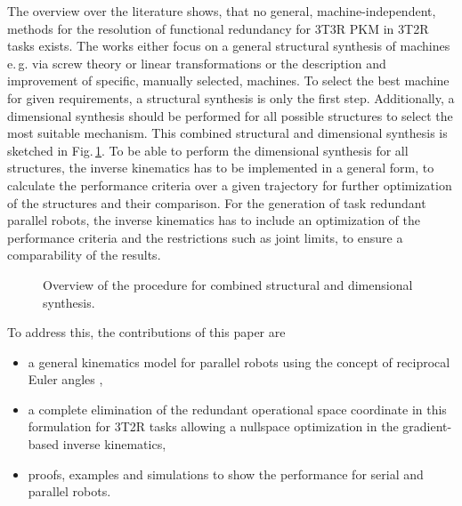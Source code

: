 \documentclass[robotics,article,submit,moreauthors,pdftex]{Definitions/mdpi}
\begin{document}
The overview over the literature shows, that no general, machine-independent, methods for the resolution of functional redundancy for 3T3R PKM in 3T2R tasks exists.
The works either focus on a general structural synthesis of machines e.\,g. via screw theory \cite{KongGos2005} or linear transformations \cite{Gogu2006} or the description and improvement of specific, manually selected, machines.
To select the best machine for given requirements, a structural synthesis is only the first step.
Additionally, a dimensional synthesis should be performed for all possible structures to select the most suitable mechanism.
This combined structural and dimensional synthesis \cite{RamirezKotOrt2015} is sketched in Fig.\,\ref{fig:structdimsynth}.
To be able to perform the dimensional synthesis for all structures, the inverse kinematics has to be implemented in a general form, to calculate the performance criteria over a given trajectory for further optimization of the structures and their comparison.
For the generation of task redundant parallel robots, the inverse kinematics has to include an optimization of the performance criteria and the restrictions such as joint limits, to ensure a comparability of the results.
%
\begin{figure}[tb]
	
	\caption{Overview of the procedure for combined structural and dimensional synthesis.}
	\label{fig:structdimsynth}
\end{figure} 
%
%
To address this, the contributions of this paper are
\begin{itemize}
\item a general kinematics model for parallel robots using the concept of reciprocal Euler angles \cite{1_SchapplerTapOrt2019},
\item a complete elimination of the redundant operational space coordinate in this formulation for 3T2R tasks allowing a nullspace optimization in the gradient-based inverse kinematics,
\item proofs, examples and simulations to show the performance for serial and parallel robots.
\end{itemize}
\end{document}

